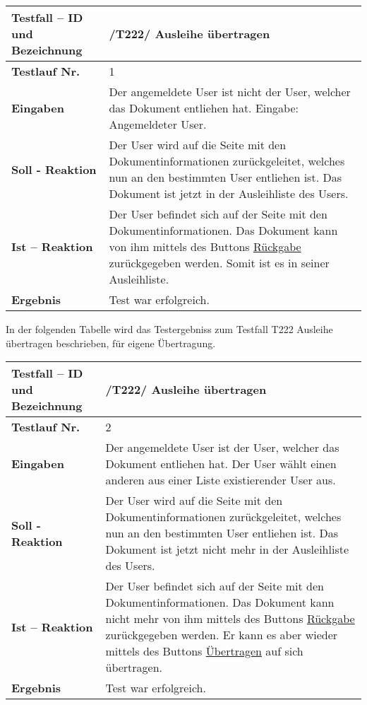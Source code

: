 \begin{longtable}{|p{5cm}|p{10cm}|}
\hline
\textbf{Testfall -- ID und Bezeichnung} & \textnormal{/T222/ Ausleihe übertragen} \\
\hline
\textbf{Testlauf Nr.} & \textnormal{1} \\
\hline
\textbf{Eingaben} & \textnormal{
Der angemeldete User ist nicht der User, welcher das Dokument
entliehen hat. Eingabe: Angemeldeter User.} \\
\hline
\textbf{Soll - Reaktion} & \textnormal{
Der User wird auf die Seite mit den Dokumentinformationen
zurückgeleitet, welches nun an den bestimmten User entliehen ist.
Das Dokument ist jetzt in der Ausleihliste des Users.
} \\
\hline
\textbf{Ist -- Reaktion} & \textnormal{
Der User befindet sich auf der Seite mit den Dokumentinformationen.
Das Dokument kann von ihm mittels des Buttons \uline{Rückgabe}
zurückgegeben werden. Somit ist es in seiner Ausleihliste.} \\
\hline
\textbf{Ergebnis} & \textnormal{
Test war erfolgreich.} \\
\hline
\end{longtable}
In der folgenden Tabelle wird das Testergebniss zum Testfall T222
Ausleihe übertragen beschrieben, für eigene Übertragung. 
\begin{longtable}{|p{5cm}|p{10cm}|}
\hline
\textbf{Testfall -- ID und Bezeichnung} & \textnormal{/T222/ Ausleihe
übertragen} \\
\hline
\textbf{Testlauf Nr.} & \textnormal{2} \\
\hline
\textbf{Eingaben} & \textnormal{
Der angemeldete User ist der User, welcher das Dokument entliehen hat. Der
User wählt einen anderen aus einer Liste existierender User aus.} \\
\hline
\textbf{Soll - Reaktion} & \textnormal{
Der User wird auf die Seite mit den Dokumentinformationen
zurückgeleitet, welches nun an den bestimmten User entliehen ist.
Das Dokument ist jetzt nicht mehr in der Ausleihliste des Users.
} \\
\hline
\textbf{Ist -- Reaktion} & \textnormal{
Der User befindet sich auf der Seite mit den Dokumentinformationen.
Das Dokument kann nicht mehr von ihm mittels des Buttons \uline{Rückgabe}
zurückgegeben werden. Er kann es aber wieder mittels des Buttons
\uline{Übertragen} auf sich übertragen.} \\
\hline
\textbf{Ergebnis} & \textnormal{
Test war erfolgreich.} \\
\hline
\end{longtable}

